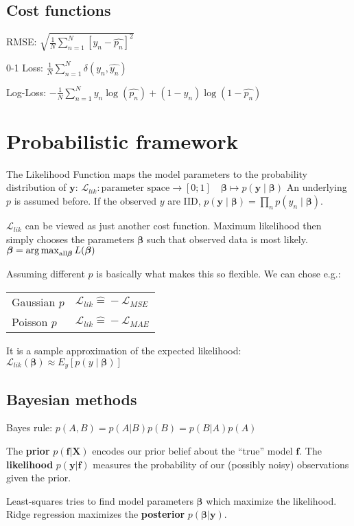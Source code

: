 \documentclass[10pt,a4paper,landscape]{article}
\renewcommand{\bf}[1]{\ensuremath{\mathbf{#1}}}
\newcommand{\bbeta}{\boldsymbol\beta}
\begin{document}
\begin{multicols*}{4}
\subsection{Cost functions}
RMSE: $\sqrt{\frac{1}{N} \sum_{n=1}^{N}\left[y_n- \hat{p_n} \right]^2}$

0-1 Loss: $ \frac{1}{N} \sum_{n=1}^{N} \delta(y_n, \hat{y_n})$

Log-Loss: $- \frac{1}{N}  \sum_{n=1}^{N} y_n \log(\hat{p_n}) + (1-y_n) \log(1-\hat{p_n})$

\section{Probabilistic framework}
The Likelihood Function maps the model parameters to the probability distribution of $\bf{y}$:
$\mathcal{L}_{lik}\colon \text{parameter space} \to [0;1]\quad  \bbeta \mapsto p(\bf{y} \mid  \bbeta)$
An underlying $p$ is assumed before. If the observed $y$ are IID, $p(\bf{y} \mid \bbeta) = \prod_n p(y_n \mid \bbeta)$.

$\mathcal{L}_{lik}$ can be viewed as just another cost function. Maximum likelihood then simply chooses the parameters $\bbeta$ such that observed data is most likely. $\bbeta = \argmax_{\text{all} \bbeta} L(\bbeta)$

Assuming different $p$ is basically what makes this so flexible. We can chose e.g.:

\begin{tabular}{ l  l }
  \hline
  Gaussian $p$ & $\mathcal{L}_{lik} \widehat{=} -\mathcal{L}_{MSE}$ \\
  Poisson $p$  & $\mathcal{L}_{lik} \widehat{=} -\mathcal{L}_{MAE}$ \\
  \hline
\end{tabular}

It is a sample approximation of the expected likelihood:
$\mathcal{L}_{lik}(\bbeta) \approx E_y[ p(y \mid \bbeta) ]$

\subsection{Bayesian methods}
Bayes rule: $p(A, B) = p(A|B) p(B) = p(B|A) p(A)$

The \textbf{prior} $p(\bf{f}|\bf{X})$ encodes our prior belief about the ``true'' model $\bf{f}$. The \textbf{likelihood} $p(\bf{y}|\bf{f})$ measures the probability of our (possibly noisy) observations given the prior.

Least-squares tries to find model parameters $\bbeta$ which maximize the likelihood. Ridge regression maximizes the \textbf{posterior} $p(\bbeta|\bf{y})$.


\end{multicols*}
\end{document}
